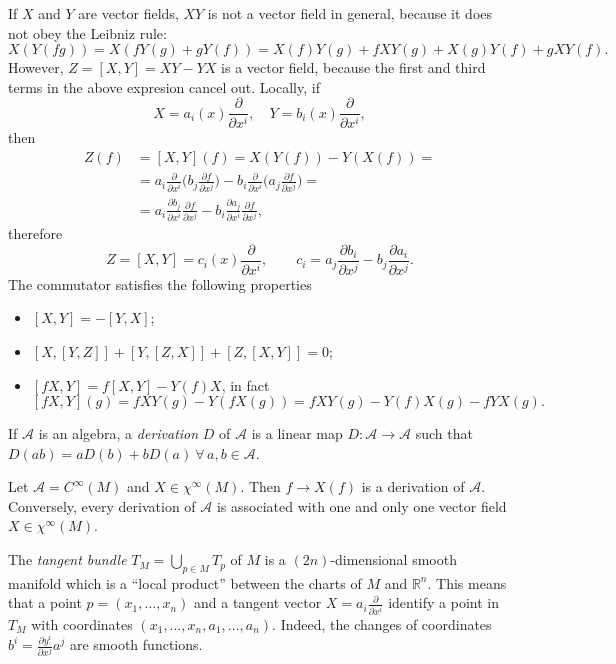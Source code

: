 \documentclass[a4paper,12pt]{book}
\begin{document}
If $X$ and $Y$ are vector fields, $XY$ is not a vector field in general, because it does not obey the Leibniz rule:
\[X(Y(fg))=X(fY(g)+gY(f))=X(f)Y(g)+fXY(g)+X(g)Y(f)+gXY(f).\]
However, $Z=[X,Y]=XY-YX$ is a vector field, because the first and third terms in the above expresion cancel out. Locally, if
\[X=a_i(x)\frac{\partial}{\partial x^i},\quad Y=b_i(x)\frac{\partial}{\partial x^i},\]
then
\[\begin{split}
Z(f)&=[X,Y](f)=X(Y(f))-Y(X(f))=\\
&=a_i\frac{\partial}{\partial x^i}\biggl(b_j\frac{\partial f}{\partial x^j}\biggr)-b_i\frac{\partial}{\partial x^i}\biggl(a_j\frac{\partial f}{\partial x^j}\biggr)=\\
&=a_i\frac{\partial b_j}{\partial x^i}\frac{\partial f}{\partial x^j}-b_i\frac{\partial a_j}{\partial x^i}\frac{\partial f}{\partial x^j},
\end{split}\]
therefore
\[Z=[X,Y]=c_i(x)\frac{\partial}{\partial x^i},\qquad c_i=a_j\frac{\partial b_i}{\partial x^j}-b_j\frac{\partial a_i}{\partial x^j}.\]
The commutator satisfies the following properties
\begin{itemize}
\item $[X,Y]=-[Y,X]$;
\item $[X,[Y,Z]]+[Y,[Z,X]]+[Z,[X,Y]]=0$;
\item $[fX,Y]=f[X,Y]-Y(f)X$, in fact
\[[fX,Y](g)=fXY(g)-Y(fX(g))=fXY(g)-Y(f)X(g)-fYX(g).\]
\end{itemize}
\begin{definition}
If $\mathcal A$ is an algebra, a \emph{derivation} $D$ of $\mathcal A$ is a linear map $D\colon \mathcal A\to \mathcal A$ such that $D(ab)=aD(b)+bD(a)\ \forall\,a,b\in\mathcal A$.
\end{definition}

Let $\mathcal A=C^\infty(M)$ and $X\in\chi^\infty(M)$. Then $f\to X(f)$ is a derivation of $\mathcal A$. Conversely, every derivation of $\mathcal A$ is associated with one and only one vector field $X\in\chi^\infty(M)$.

\begin{definition}
The \emph{tangent bundle} $T_M=\bigcup_{p\in M}T_p$ of $M$ is a $(2n)$-dimensional smooth manifold which is a ``local product'' between the charts of $M$ and $\mathbb R^n$. This means that a point $p=(x_1,\ldots,x_n)$ and a tangent vector $X=a_i\frac{\partial}{\partial x^i}$ identify a point in $T_M$ with coordinates $(x_1,\ldots,x_n,a_1,\ldots,a_n)$. Indeed, the changes of coordinates $b^i=\frac{\partial y^i}{\partial x^j}a^j$ are smooth functions.
\end{definition}
\end{document}
